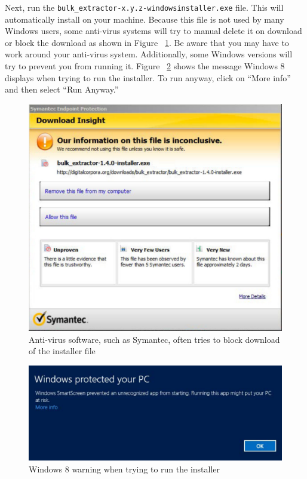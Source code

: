 \documentclass[11pt]{article} %
\begin{document}
Next, run the \texttt{bulk\_extractor-x.y.z-windowsinstaller.exe} file. This will automatically install \bulk on your machine. Because this file is not used by many Windows users, some anti-virus systems will try to manual delete it on download or block the download as shown in Figure ~\ref{fig:installer_download}.  Be aware that you may have to work around your anti-virus system. Additionally, some Windows versions will try to prevent you from running it. Figure ~\ref{fig:windowsWarning} shows the message Windows 8 displays when trying to run the installer. To run anyway, click on ``More info'' and then select ``Run Anyway.''\\
\begin{figure}
	\center
	\includegraphics[scale=.60]{installPics/installer_download.pdf}
	\caption{Anti-virus software, such as Symantec, often tries to block download of the installer file}
	\label{fig:installer_download}
\end{figure}

\begin{figure}
	\center
	\includegraphics[scale=.50]{installPics/windowsWarning2.pdf}
	\caption{Windows 8 warning when trying to run the installer}
	\label{fig:windowsWarning}
\end{figure}
\end{document}

